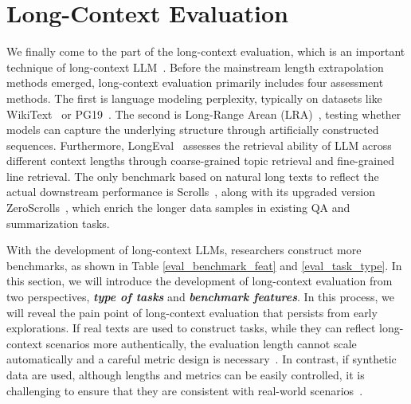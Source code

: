 \section{Long-Context Evaluation}\label{sec11}

We finally come to the part of the long-context evaluation, which is an important technique of long-context LLM~\citep{an2023eval,bai2023longbench,zhang2024bench,niah,hsieh2024ruler,yen2024helmet}. Before the mainstream length extrapolation methods emerged, long-context evaluation primarily includes four assessment methods. The first is language modeling perplexity, typically on datasets like WikiText~\citep{merity2022pointer} or PG19~\citep{rae2019compressive}. The second is Long-Range Arean (LRA)~\citep{taylong}, testing whether models can capture the underlying structure through artificially constructed sequences. Furthermore, LongEval~\citep{longchat} assesses the retrieval ability of LLM across different context lengths through coarse-grained topic retrieval and fine-grained line retrieval. The only benchmark based on natural long texts to reflect the actual downstream performance is Scrolls~\citep{shaham2022scrolls}, along with its upgraded version ZeroScrolls~\citep{shaham2023zeroscrolls}, which enrich the longer data samples in existing QA and summarization tasks.

With the development of long-context LLMs, researchers construct more benchmarks, as shown in Table \ref{eval_benchmark_feat} and \ref{eval_task_type}. In this section, we will introduce the development of long-context evaluation from two perspectives, \textbf{\textit{type of tasks}} and \textbf{\textit{benchmark features}}. In this process, we will reveal the pain point of long-context evaluation that persists from early explorations. If real texts are used to construct tasks, while they can reflect long-context scenarios more authentically, the evaluation length cannot scale automatically and a careful metric design is necessary~\citep{zhang2023movqa,xu2024detectiveqa,yen2024helmet}. In contrast, if synthetic data are used, although lengths and metrics can be easily controlled, it is challenging to ensure that they are consistent with real-world scenarios~\citep{hsieh2024ruler,li2024needlebench}.

